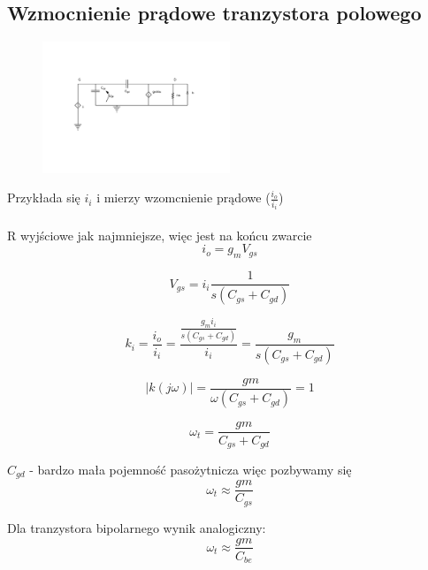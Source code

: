 \documentclass[10pt,a4paper]{article}
\begin{document}
\subsection{Wzmocnienie prądowe tranzystora polowego}

\begin{figure}[H]
\centering
\includegraphics[width=0.5\textwidth]{wzmoc_tranzystora}
\end{figure}

Przykłada się $i_i$ i mierzy wzomcnienie prądowe ($\frac{i_o}{i_i}$)\\
\\
R wyjściowe jak najmniejsze, więc jest na końcu zwarcie
\begin{equation}
i_o = g_m V_{gs}
\end{equation}

\begin{equation}
V_{gs} = i_i \frac{1}{s(C_{gs} + C_{gd})}
\end{equation}

\begin{equation}
k_i = \frac{i_o}{i_i} = \frac{ \frac{g_m i_i}{s(C_{gs} + C_{gd})} }{i_i} = \frac{g_m}{s(C_{gs} + C_{gd})}
\end{equation}

\begin{equation}
|k(j\omega)| = \frac{gm}{\omega(C_{gs} + C_{gd})} = 1
\end{equation}

\begin{equation}
\omega _t = \frac{gm}{C_{gs} + C_{gd}}
\end{equation}

$C_{gd}$ - bardzo mała pojemność pasożytnicza więc pozbywamy się
\begin{equation}
\omega _t \approx \frac{gm}{C_{gs}}
\end{equation}

Dla tranzystora bipolarnego wynik analogiczny:
\begin{equation}
\omega _t \approx \frac{gm}{C_{be}}
\end{equation}
\end{document}
